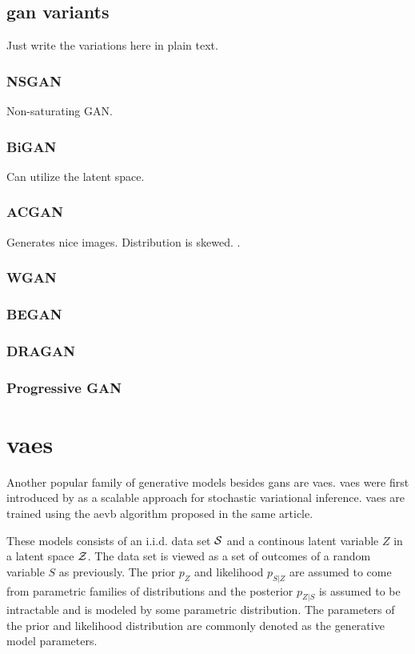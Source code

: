 \subsection{\acrshort{gan} variants}
Just write the variations here in plain text.
\subsubsection{NSGAN} Non-saturating GAN.
\subsubsection{BiGAN}
Can utilize the latent space.
\subsubsection{ACGAN}
Generates nice images. \textcite{odena2016conditional} Distribution is skewed. \textcite{shuac2017acganisbad}.
\subsubsection{WGAN}
\subsubsection{BEGAN}
\subsubsection{DRAGAN}
\subsubsection{Progressive GAN}

\section{\acrlong{vaes}}
Another popular family of generative models besides \acrshort{gans} are \acrfull{vaes}. \acrlong{vaes} were first introduced by \textcite{kingma2013auto} as a scalable approach for stochastic variational inference. \acrshort{vaes} are trained using the \acrfull{aevb} algorithm proposed in the same article. 

These models consists of an i.i.d. data set $\mathcal{S}$ and a continous latent variable $Z$ in a latent space $\mathcal{Z}$. The data set is viewed as a set of outcomes of a random variable $S$ as previously. The prior $p_Z$ and likelihood $p_{S|Z}$ are assumed to come from parametric families of distributions and the posterior $p_{Z|S}$ is assumed to be intractable and is modeled by some parametric distribution. The parameters of the prior and likelihood distribution are commonly denoted as the generative model parameters.

